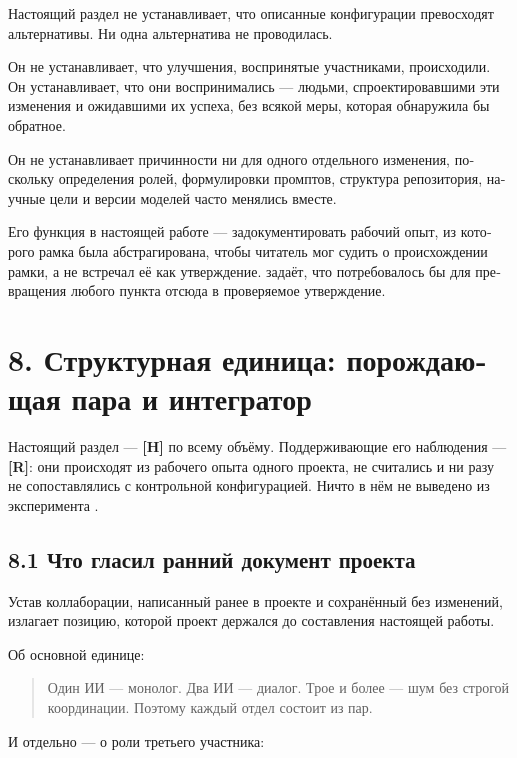 \begin{russian}
Настоящий раздел не устанавливает, что описанные конфигурации превосходят альтернативы. Ни одна альтернатива не проводилась.

Он не устанавливает, что улучшения, воспринятые участниками, происходили. Он устанавливает, что они воспринимались — людьми, спроектировавшими эти изменения и ожидавшими их успеха, без всякой меры, которая обнаружила бы обратное.

Он не устанавливает причинности ни для одного отдельного изменения, поскольку определения ролей, формулировки промптов, структура репозитория, научные цели и версии моделей часто менялись вместе.

Его функция в настоящей работе — задокументировать рабочий опыт, из которого рамка была абстрагирована, чтобы читатель мог судить о происхождении рамки, а не встречал её как утверждение.  задаёт, что потребовалось бы для превращения любого пункта отсюда в проверяемое утверждение.


\section*{8. Структурная единица: порождающая пара и интегратор}
\label{sec:ru:8}

Настоящий раздел — \textbf{[H]} по всему объёму. Поддерживающие его наблюдения — \textbf{[R]}: они происходят из рабочего опыта одного проекта, не считались и ни разу не сопоставлялись с контрольной конфигурацией. Ничто в нём не выведено из эксперимента .


\subsection*{8.1 Что гласил ранний документ проекта}
\label{sec:ru:8.1}

Устав коллаборации, написанный ранее в проекте и сохранённый без изменений, излагает позицию, которой проект держался до составления настоящей работы.

Об основной единице:

\begin{quote}
Один ИИ — монолог. Два ИИ — диалог. Трое и более — шум без строгой координации. Поэтому каждый отдел состоит из пар.
\end{quote}
И отдельно — о роли третьего участника:


\end{russian}
